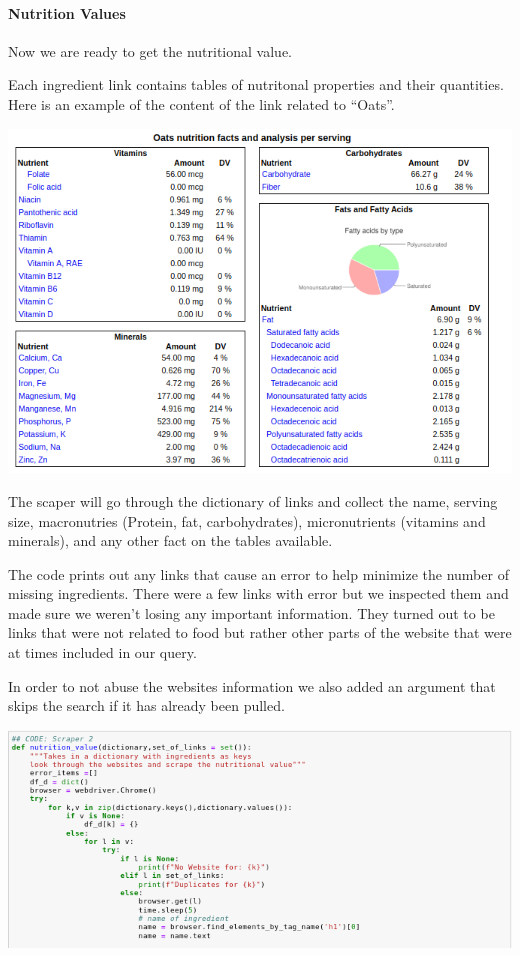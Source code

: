 \documentclass[11pt]{article}
\makeatletter
\def\maxwidth{\ifdim\Gin@nat@width>\linewidth\linewidth
    \else\Gin@nat@width\fi}
\let\Oldincludegraphics\includegraphics
\renewcommand{\includegraphics}[1]{\Oldincludegraphics[width=.8\maxwidth]{#1}}
\makeatother
\begin{document}
    \hypertarget{nutrition-values}{%
\paragraph{Nutrition Values}\label{nutrition-values}}

Now we are ready to get the nutritional value.

Each ingredient link contains tables of nutritonal properties and their
quantities. Here is an example of the content of the link related to
``Oats''.

\includegraphics{nutrition_values_oats.png}

    The scaper will go through the dictionary of links and collect the name,
serving size, macronutries (Protein, fat, carbohydrates), micronutrients
(vitamins and minerals), and any other fact on the tables available.

The code prints out any links that cause an error to help minimize the
number of missing ingredients. There were a few links with error but we
inspected them and made sure we weren't losing any important
information. They turned out to be links that were not related to food
but rather other parts of the website that were at times included in our
query.

In order to not abuse the websites information we also added an argument
that skips the search if it has already been pulled.

\includegraphics{split5.png}
\end{document}
